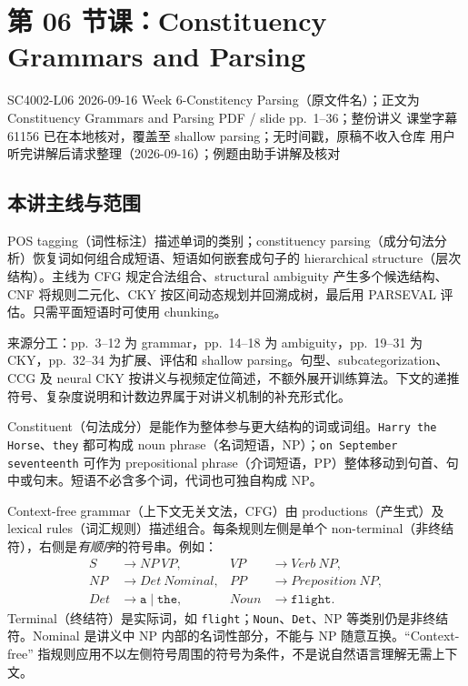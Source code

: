 
\section{第 06 节课：Constituency Grammars and Parsing}
\label{lecture:SC4002-L06}

\lecturemeta
  {SC4002-L06}
  {2026-09-16}
  {Week 6-Constitency Parsing（原文件名）；正文为 Constituency Grammars and Parsing}
  {PDF / slide pp.~1--36；整份讲义}
  {课堂字幕 61156 已在本地核对，覆盖至 shallow parsing；无时间戳，原稿不收入仓库}
  {用户听完讲解后请求整理（2026-09-16）；例题由助手讲解及核对}

\subsection{本讲主线与范围}

POS tagging（词性标注）描述单词的类别；constituency parsing（成分句法分析）恢复词如何组合成短语、短语如何嵌套成句子的 hierarchical structure（层次结构）。主线为 CFG 规定合法组合、structural ambiguity 产生多个候选结构、CNF 将规则二元化、CKY 按区间动态规划并回溯成树，最后用 PARSEVAL 评估。只需平面短语时可使用 chunking。

来源分工：pp.~3--12 为 grammar，pp.~14--18 为 ambiguity，pp.~19--31 为 CKY，pp.~32--34 为扩展、评估和 shallow parsing。句型、subcategorization、CCG 及 neural CKY 按讲义与视频定位简述，不额外展开训练算法。下文的递推符号、复杂度说明和计数边界属于对讲义机制的补充形式化。


Constituent（句法成分）是能作为整体参与更大结构的词或词组。\texttt{Harry the Horse}、\texttt{they} 都可构成 noun phrase（名词短语，NP）；\texttt{on September seventeenth} 可作为 prepositional phrase（介词短语，PP）整体移动到句首、句中或句末。短语不必含多个词，代词也可独自构成 NP。

Context-free grammar（上下文无关文法，CFG）由 productions（产生式）及 lexical rules（词汇规则）描述组合。每条规则左侧是单个 non-terminal（非终结符），右侧是\emph{有顺序}的符号串。例如：
\[
\begin{aligned}
  S&\rightarrow NP\ VP, & VP&\rightarrow Verb\ NP,\\
  NP&\rightarrow Det\ Nominal, & PP&\rightarrow Preposition\ NP,\\
  Det&\rightarrow\texttt{a}\mid\texttt{the}, & Noun&\rightarrow\texttt{flight}.
\end{aligned}
\]
Terminal（终结符）是实际词，如 \texttt{flight}；\texttt{Noun}、\texttt{Det}、NP 等类别仍是非终结符。Nominal 是讲义中 NP 内部的名词性部分，不能与 NP 随意互换。``Context-free'' 指规则应用不以左侧符号周围的符号为条件，不是说自然语言理解无需上下文。

